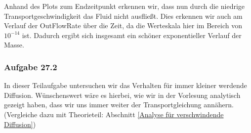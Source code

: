 \begin{figure}[H]
\end{figure}
Anhand des Plots zum Endzeitpunkt erkennen wir, dass nun durch die niedrige Transportgeschwindigkeit das Fluid nicht ausfließt.
Dies erkennen wir auch am Verlauf der OutFlowRate über die Zeit, da die Werteskala hier im Bereich von $10^{-14}$ ist. Dadurch ergibt sich insgesamt ein schöner exponentieller Verlauf der Masse.
\subsubsection{Aufgabe 27.2}
In dieser Teilaufgabe untersuchen wir das Verhalten für immer kleiner werdende Diffusion. Wünschenswert wäre es hierbei, wie wir in der Vorlesung analytisch gezeigt haben, dass wir uns immer weiter der Transportgleichung annähern. (Vergleiche dazu mit Theorieteil: Abschnitt \ref{Analyse für verschwindende Diffusion})

\begin{figure}[H]
	\centering
\end{figure}


